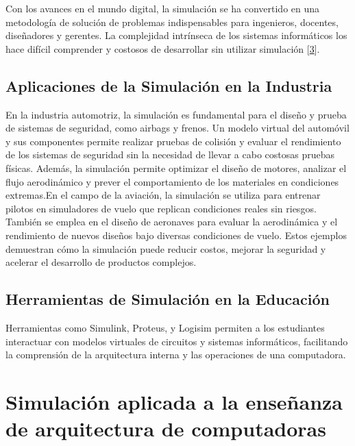 \documentclass[12pt,twoside]{templates/unerthesis}
\begin{document}
Con los avances en el mundo digital, la simulación se ha convertido en una metodología de solución de problemas indispensables para ingenieros, docentes, diseñadores y gerentes. La complejidad intrínseca de los sistemas informáticos los hace difícil comprender y costosos de desarrollar sin utilizar simulación {[}\protect\hyperlink{ref-law_simulation_2015}{3}{]}.

\hypertarget{aplicaciones-de-la-simulaciuxf3n-en-la-industria}{%
\subsection{Aplicaciones de la Simulación en la Industria}\label{aplicaciones-de-la-simulaciuxf3n-en-la-industria}}

En la industria automotriz, la simulación es fundamental para el diseño y prueba de sistemas de seguridad, como airbags y frenos. Un modelo virtual del automóvil y sus componentes permite realizar pruebas de colisión y evaluar el rendimiento de los sistemas de seguridad sin la necesidad de llevar a cabo costosas pruebas físicas. Además, la simulación permite optimizar el diseño de motores, analizar el flujo aerodinámico y prever el comportamiento de los materiales en condiciones extremas.En el campo de la aviación, la simulación se utiliza para entrenar pilotos en simuladores de vuelo que replican condiciones reales sin riesgos. También se emplea en el diseño de aeronaves para evaluar la aerodinámica y el rendimiento de nuevos diseños bajo diversas condiciones de vuelo. Estos ejemplos demuestran cómo la simulación puede reducir costos, mejorar la seguridad y acelerar el desarrollo de productos complejos.

\hypertarget{herramientas-de-simulaciuxf3n-en-la-educaciuxf3n}{%
\subsection{Herramientas de Simulación en la Educación}\label{herramientas-de-simulaciuxf3n-en-la-educaciuxf3n}}

Herramientas como Simulink, Proteus, y Logisim permiten a los estudiantes interactuar con modelos virtuales de circuitos y sistemas informáticos, facilitando la comprensión de la arquitectura interna y las operaciones de una computadora.

\hypertarget{simulaciuxf3n-aplicada-a-la-enseuxf1anza-de-arquitectura-de-computadoras}{%
\section{Simulación aplicada a la enseñanza de arquitectura de computadoras}\label{simulaciuxf3n-aplicada-a-la-enseuxf1anza-de-arquitectura-de-computadoras}}
\end{document}
